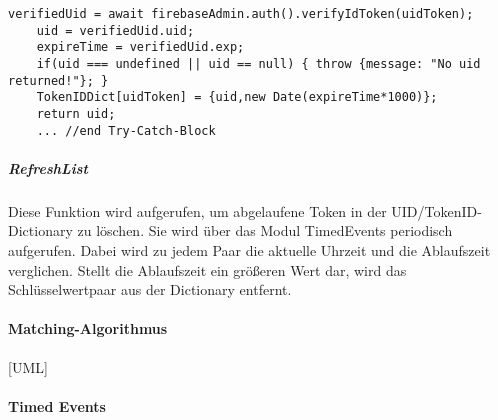 \begin{lstlisting}[caption=Firebase-Service Register, label=lst:firebaseService Register]
	verifiedUid = await firebaseAdmin.auth().verifyIdToken(uidToken);
	uid = verifiedUid.uid;
	expireTime = verifiedUid.exp;
	if(uid === undefined || uid == null) { throw {message: "No uid returned!"}; }
    TokenIDDict[uidToken] = {uid,new Date(expireTime*1000)};
    return uid;
    ... //end Try-Catch-Block
\end{lstlisting}
   

\subparagraph{RefreshList}
Diese Funktion wird aufgerufen, um abgelaufene Token in der UID/TokenID-Dictionary zu löschen. Sie wird über das Modul TimedEvents periodisch aufgerufen. Dabei wird zu jedem Paar die aktuelle Uhrzeit und die Ablaufszeit verglichen. Stellt die Ablaufszeit ein größeren Wert dar, wird das Schlüsselwertpaar aus der Dictionary entfernt.


\paragraph{Matching-Algorithmus}

[UML]

\paragraph{Timed Events}